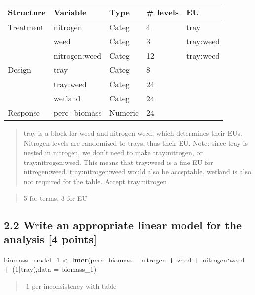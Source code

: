 \documentclass[
]{article}
\newenvironment{Shaded}{\begin{snugshade}}{\end{snugshade}}
\newcommand{\DataTypeTok}[1]{\textcolor[rgb]{0.13,0.29,0.53}{#1}}
\newcommand{\DecValTok}[1]{\textcolor[rgb]{0.00,0.00,0.81}{#1}}
\newcommand{\KeywordTok}[1]{\textcolor[rgb]{0.13,0.29,0.53}{\textbf{#1}}}
\newcommand{\NormalTok}[1]{#1}
\newcommand{\OperatorTok}[1]{\textcolor[rgb]{0.81,0.36,0.00}{\textbf{#1}}}
\newcommand{\StringTok}[1]{\textcolor[rgb]{0.31,0.60,0.02}{#1}}
\begin{document}
\begin{longtable}[]{@{}lllll@{}}
\toprule
Structure & Variable & Type & \# levels & EU\tabularnewline
\midrule
\endhead
Treatment & nitrogen & Categ & 4 & tray\tabularnewline
& weed & Categ & 3 & tray:weed\tabularnewline
& nitrogen:weed & Categ & 12 & tray:weed\tabularnewline
Design & tray & Categ & 8 &\tabularnewline
& tray:weed & Categ & 24 &\tabularnewline
& wetland & Categ & 24 &\tabularnewline
Response & perc\_biomass & Numeric & 24 &\tabularnewline
\bottomrule
\end{longtable}

\begin{quote}
tray is a block for weed and nitrogen weed, which determines their EUs.
Nitrogen levels are randomized to trays, thus their EU. Note: since tray
is nested in nitrogen, we don't need to make tray:nitrogen, or
tray:nitrogen:weed. This means that tray:weed is a fine EU for
nitrogen:weed. tray:nitrogen:weed would also be acceptable. wetland is
also not required for the table. Accept tray:nitrogen
\end{quote}

\begin{quote}
5 for terms, 3 for EU
\end{quote}

\hypertarget{write-an-appropriate-linear-model-for-the-analysis-4-points}{%
\subsection{2.2 Write an appropriate linear model for the analysis {[}4
points{]}}\label{write-an-appropriate-linear-model-for-the-analysis-4-points}}

\begin{Shaded}
\begin{Highlighting}[]
\NormalTok{biomass_model_}\DecValTok{1}\NormalTok{ <-}\StringTok{ }\KeywordTok{lmer}\NormalTok{(perc_biomass }\OperatorTok{~}\StringTok{ }\NormalTok{nitrogen }\OperatorTok{+}\StringTok{ }\NormalTok{weed }\OperatorTok{+}\StringTok{ }\NormalTok{nitrogen}\OperatorTok{:}\NormalTok{weed }\OperatorTok{+}\StringTok{ }\NormalTok{(}\DecValTok{1}\OperatorTok{|}\NormalTok{tray),}\DataTypeTok{data =}\NormalTok{ biomass_}\DecValTok{1}\NormalTok{)}
\end{Highlighting}
\end{Shaded}

\begin{quote}
-1 per inconsistency with table
\end{quote}
\end{document}
